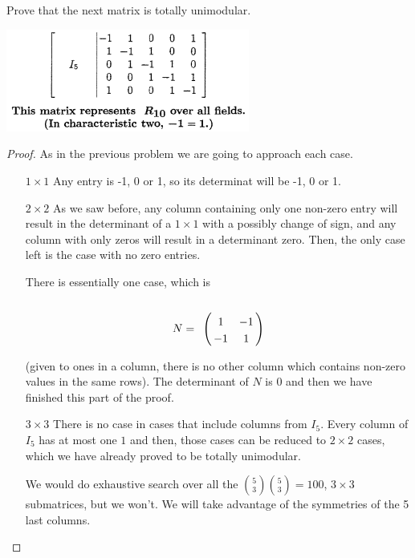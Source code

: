 \prob
{
    Prove that the next matrix is totally unimodular.
    \begin{center}
        \includegraphics[width=8cm]{Test3/Problem2/R10.png}
    \end{center}\pn
}
\begin{proof}
    As in the previous problem we are going to approach each case.
    
    \begin{itemize}
        \item [$1 \times 1$]
            Any entry is -1, 0 or 1, so its determinat will be -1, 0 or 1.\pn
        \item [$2 \times 2$]
            As we saw before, any column containing only one non-zero entry will result in the determinant of a 
            $1 \times 1$ with a possibly change of sign, and any column with only zeros will result in a determinant
            zero. Then, the only case left is the case with no zero entries.\pn
            
            There is essentially one case, which is
                \begin{align}
                    N =
                        \bordermatrix{
                                &       &       \cr
                                &   1   &  -1   \cr
                                &  -1   &   1  
                        }    
                \end{align}
                
            (given to ones in a column, there is no other column which contains non-zero values in the same rows).
            The determinant of $N$ is 0 and then we have finished this part of the proof.
        
        \item [$3 \times 3$]
            There is no case in cases that include columns from $I_5$. Every column of $I_5$ has at most one $1$ and 
            then, those cases can be reduced to $2 \times 2$ cases, which we have already proved to be totally unimodular.\pn
            
            We would do exhaustive search over all the $\binom{5}{3} \binom{5}{3} = 100$, $3 \times 3$ submatrices, but we won't.
            We will take advantage of the symmetries of the 5 last columns.\pn
            

\end{itemize}
\end{proof}
